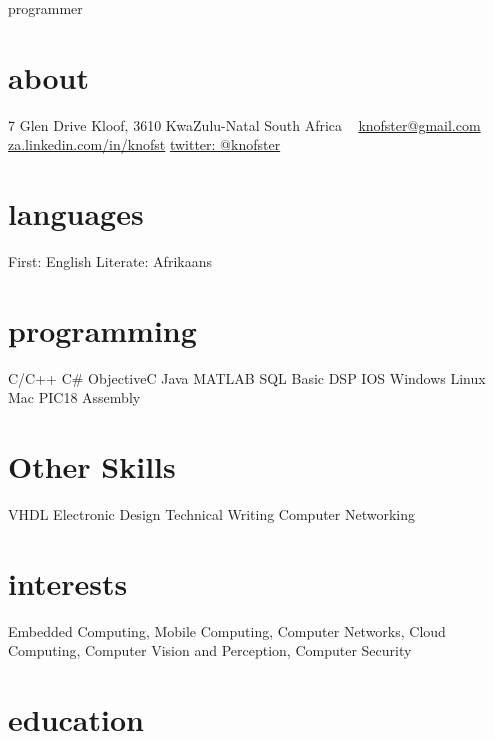 \documentclass[]{friggeri-cv}
\begin{document}
       {programmer}


\begin{aside}
  \section{about}
    7 Glen Drive
    Kloof, 3610
    KwaZulu-Natal
    South Africa 
    ~
    \href{mailto:knofster@gmail.com}{knofster@gmail.com}
    \href{http://za.linkedin.com/in/knofst}{za.linkedin.com/in/knofst}
    \href{https://twitter.com/knofster}{twitter: @knofster}
  \section{languages}
    First: English
    Literate: Afrikaans
  \section{programming}
    C/C++
    C\#
    ObjectiveC
    Java
    MATLAB
    SQL
   	Basic DSP
   	IOS
   	Windows
   	Linux
   	Mac
   	PIC18 Assembly
  \section{Other Skills}
  	VHDL
  	Electronic Design
  	Technical Writing
  	Computer Networking
    
\end{aside}

\section{interests}

Embedded Computing, Mobile Computing, Computer Networks, Cloud Computing, Computer Vision and Perception, Computer Security 

\section{education}
\end{document}
